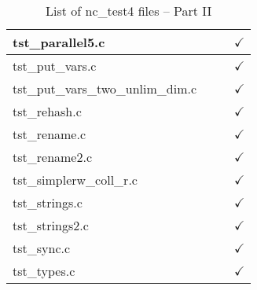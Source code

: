 \begin{table}[H]
\begin{tabular}{|l|c|c|c|}
tst\_parallel5.c        &               &               & $\checkmark$    \\ \hline
tst\_put\_vars.c        &               &               & $\checkmark$    \\ \hline
tst\_put\_vars\_two\_unlim\_dim.c  &    &               & $\checkmark$    \\ \hline
tst\_rehash.c           &               &               & $\checkmark$    \\ \hline
tst\_rename.c           &               &               & $\checkmark$    \\ \hline
tst\_rename2.c          &               &               & $\checkmark$    \\ \hline
tst\_simplerw\_coll\_r.c   &            &               & $\checkmark$    \\ \hline
tst\_strings.c          &               &               & $\checkmark$    \\ \hline
tst\_strings2.c         &               &               & $\checkmark$    \\ \hline
tst\_sync.c             &               &               & $\checkmark$    \\ \hline
tst\_types.c            &               &               & $\checkmark$    \\ \hline
\hline
\end{tabular}
\caption{\label{tab:nc_test4_2} List of nc\_test4 files -- Part II}
\end{table}

